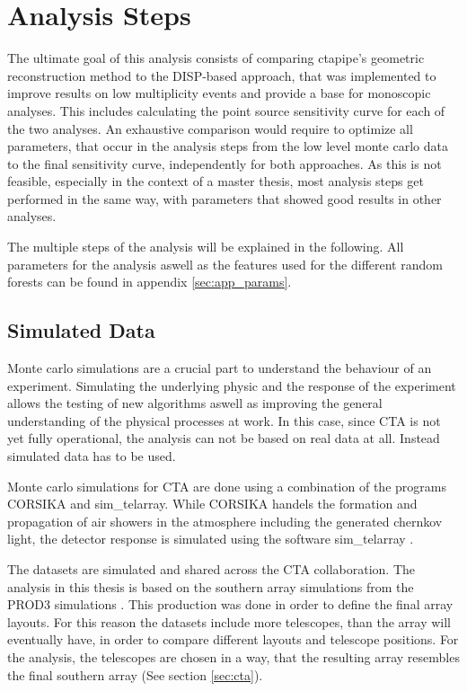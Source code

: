 \chapter{Analysis Steps}
\label{analysis}

The ultimate goal of this analysis consists of comparing 
ctapipe's geometric reconstruction method to the DISP-based approach,
that was implemented to improve results on low multiplicity events
and provide a base for monoscopic analyses.
This includes calculating the point source sensitivity curve
for each of the two analyses.
An exhaustive comparison would require to optimize all parameters,
that occur in the analysis steps from the low level monte carlo
data to the final sensitivity curve, independently for both approaches.
As this is not feasible, especially in the context of a master thesis, 
most analysis steps get performed in the same way, 
with parameters that showed good results in other analyses.

The multiple steps of the analysis will be explained in the following.
All parameters for the analysis aswell as the features used for the
different random forests can be found in appendix \ref{sec:app_params}.

\section{Simulated Data}
Monte carlo simulations are a crucial part to 
understand the behaviour of an experiment. 
Simulating the underlying physic and the response of the experiment
allows the testing of new algorithms aswell as improving the general understanding
of the physical processes at work. 
In this case, since CTA is not yet fully operational,
the analysis can not be based on real data at all.
Instead simulated data has to be used.

Monte carlo simulations for CTA are done using a combination of the
programs CORSIKA and sim\_telarray.
While CORSIKA handels the formation and propagation of air showers
in the atmosphere including the generated chernkov light,
the detector response is simulated using the software
sim\_telarray \cite{BERNLOHR2008149}.

The datasets are simulated and shared across the CTA collaboration.
The analysis in this thesis is based on the southern array simulations
from the PROD3 simulations \cite{ACHARYYA201935}. 
This production was done in order to define the final array layouts. 
For this reason the datasets include more telescopes, 
than the array will eventually have, in order to compare
different layouts and telescope positions.
For the analysis, the telescopes are chosen in a way, that
the resulting array resembles the final southern array (See section \ref{sec:cta}).


